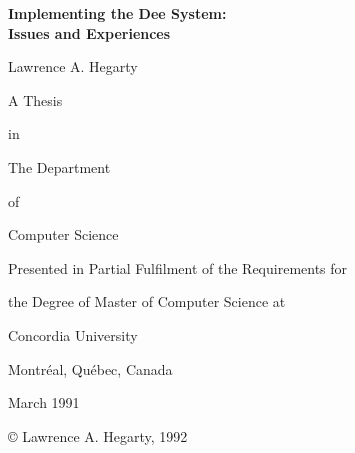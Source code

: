   \begin{titlepage}
     \vspace*{2ex}
     \begin{center}
       {\bf Implementing the Dee System:}\\
       {\bf Issues and Experiences}
     \end{center}
     \vspace{10ex}
     \begin{center}
	Lawrence A. Hegarty
     \end{center}
     \vspace{11ex}
     \begin{center}
        A Thesis
     \end{center}
     \vspace*{-3ex}
     \begin{center}
        in
     \end{center}
     \vspace*{-3ex}
     \begin{center}
        The Department
     \end{center}
     \vspace*{-3ex}
     \begin{center}
        of
     \end{center}
     \vspace*{-3ex}
     \begin{center}
       Computer Science 
     \end{center}
     \vspace{14ex}
     \begin{center}
        Presented in Partial Fulfilment of the Requirements for
     \end{center}
     \vspace*{-3ex}
     \begin{center}
        the Degree of Master of Computer Science at
     \end{center}
     \vspace*{-3ex}
     \begin{center}
        Concordia University
     \end{center}
     \vspace*{-3ex}
     \begin{center}
        Montr\'{e}al, Qu\'{e}bec, Canada
     \end{center}
     \vspace{10ex}
     \begin{center}
        March 1991
     \end{center}
     \vspace{5ex}
     \begin{center}
        \copyright \hspace{2ex} Lawrence A. Hegarty, 1992
     \end{center}
  \end{titlepage}

